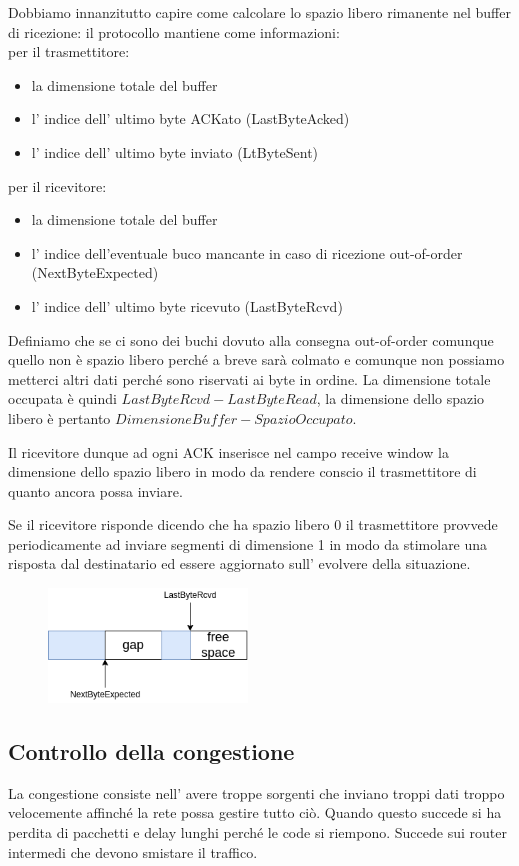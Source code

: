 Dobbiamo innanzitutto capire come calcolare lo spazio libero rimanente nel buffer di ricezione: il protocollo mantiene come informazioni:\\ per il trasmettitore:
\begin{itemize}
    \item la dimensione totale del buffer
    \item l' indice dell' ultimo byte ACKato (LastByteAcked)
    \item l' indice dell' ultimo byte inviato (LtByteSent)
\end{itemize}
per il ricevitore:
\begin{itemize}
    \item la dimensione totale del buffer
    \item l' indice dell'eventuale buco mancante in caso di ricezione out-of-order (NextByteExpected)
    \item l' indice dell' ultimo byte ricevuto (LastByteRcvd)
\end{itemize}
Definiamo che se ci sono dei buchi dovuto alla consegna out-of-order comunque quello non è spazio libero perché a breve sarà colmato e comunque non possiamo metterci altri dati perché sono riservati ai byte in ordine.
La dimensione totale occupata è quindi $LastByteRcvd - LastByteRead$, la dimensione dello spazio libero è pertanto $DimensioneBuffer - SpazioOccupato$.

Il ricevitore dunque ad ogni ACK inserisce nel campo receive window la dimensione dello spazio libero in modo da rendere conscio il trasmettitore di quanto ancora possa inviare.

Se il ricevitore risponde dicendo che ha spazio libero 0 il trasmettitore provvede periodicamente ad inviare segmenti di dimensione 1 in modo da stimolare una risposta dal destinatario ed essere aggiornato sull' evolvere della situazione.

\begin{figure}[H]
    \centering
    \includegraphics[width=200px]{images/6_Trasporto/free_space_calculation.png}
\end{figure}

\subsection{Controllo della congestione}
La congestione consiste nell' avere troppe sorgenti che inviano troppi dati troppo velocemente affinché la rete possa gestire tutto ciò.
Quando questo succede si ha perdita di pacchetti e delay lunghi perché le code si riempono.
Succede sui router intermedi che devono smistare il traffico.

